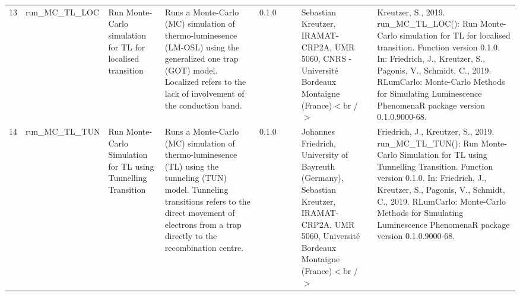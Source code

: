 \begin{table}[ht]
\begin{tabular}{rllllllll}
 \\ 
  13 & run\_MC\_TL\_LOC & Run Monte-Carlo simulation for TL for localised transition & Runs a Monte-Carlo (MC) simulation of thermo-luminesence (LM-OSL) using the generalized one trap (GOT) model. Localized refers to the lack of involvement of the conduction band. & 0.1.0
 &  &  & Sebastian Kreutzer, IRAMAT-CRP2A, UMR 5060, CNRS - Université Bordeaux Montaigne (France)$<$br /$>$ & Kreutzer, S., 2019. run\_MC\_TL\_LOC(): Run Monte-Carlo simulation for TL for localised transition. Function version 0.1.0. In: Friedrich, J., Kreutzer, S., Pagonis, V., Schmidt, C., 2019. RLumCarlo: Monte-Carlo Methods for Simulating Luminescence PhenomenaR package version 0.1.0.9000-68. 
 \\ 
  14 & run\_MC\_TL\_TUN & Run Monte-Carlo Simulation for TL using Tunnelling Transition & Runs a Monte-Carlo (MC) simulation of thermo-luminesence (TL) using the tunneling (TUN) model. Tunneling transitions refers to the direct movement of electrons from a trap directly to the recombination centre. & 0.1.0
 &  &  & Johannes Friedrich, University of Bayreuth (Germany), Sebastian Kreutzer, IRAMAT-CRP2A, UMR 5060, Université Bordeaux Montaigne (France)$<$br /$>$ & Friedrich, J., Kreutzer, S., 2019. run\_MC\_TL\_TUN(): Run Monte-Carlo Simulation for TL using Tunnelling Transition. Function version 0.1.0. In: Friedrich, J., Kreutzer, S., Pagonis, V., Schmidt, C., 2019. RLumCarlo: Monte-Carlo Methods for Simulating Luminescence PhenomenaR package version 0.1.0.9000-68. 
 \\ 
   \hline
\end{tabular}
\end{table}

